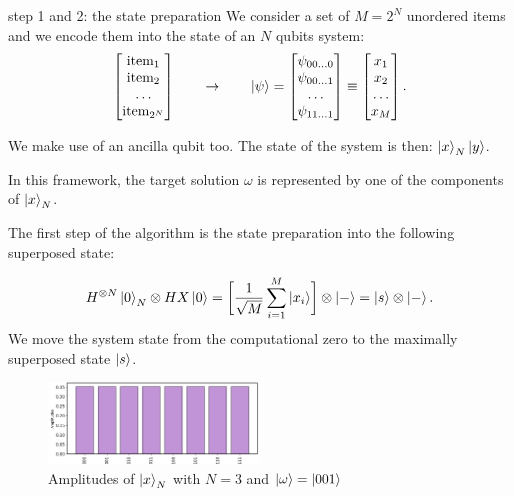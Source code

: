 \documentclass[aspectratio=169, 8pt, xcolor={svgnames}, hyperref={linkcolor=black}]{beamer}
\begin{document}
\begin{frame}{step 1 and 2: the state preparation}
We consider a set of $M=2^{N}$ unordered items and we encode them into the state of
an $N$ qubits system:
$$
\begin{bmatrix}
\text{item}_1 \\
\text{item}_2 \\
\dots \\
\text{item}_{2^N}
\end{bmatrix} \qquad \to \qquad
\ket{\psi} = \begin{bmatrix}
\psi_{00 \dots 0} \\
\psi_{00 \dots 1}  \\
\dots \\
\psi_{11 \dots 1}
\end{bmatrix}
\equiv
\begin{bmatrix}
x_1 \\
x_2  \\
\dots \\
x_M
\end{bmatrix} .
$$
\pause

We make use of an ancilla qubit too. The state of the system is then: $\ket{x}_N \ket{y}$. \pause

In this framework, the target solution $\omega$ is represented by one of the components of $\ket{x}_N$. \pause

The first step of the algorithm is the state preparation into the following superposed state:
\begin{multicols}{2}
$$ H^{\otimes N} \ket{0}_N \otimes HX \ket{0} = \biggl[ \frac{1}{\sqrt{M}}\sum_{i=1}^{M} \ket{x_i} \biggr] \otimes \ket{-} = \ket{s}\otimes \ket{-}. $$
\textcolor{carnelian}{We move the system state from the computational zero
to the maximally superposed state $\ket{s}$.}

\begin{figure}
   \includegraphics[width=0.5\textwidth]{figures/state1.png}
   \caption*{Amplitudes of $\ket{x}_N$ with $N=3$ and $\ket{\omega} = \ket{001}$}
\end{figure}
\end{multicols}

\end{frame}
\end{document}
